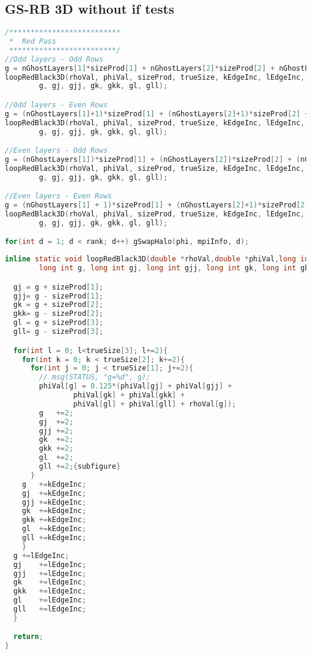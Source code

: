 \subsection{GS-RB 3D without if tests}
\begin{lstlisting}[language=c, caption = main routine]
/**************************
 *	Red Pass
 *************************/
//Odd layers - Odd Rows
g = nGhostLayers[1]*sizeProd[1] + nGhostLayers[2]*sizeProd[2] + nGhostLayers[3]*sizeProd[3];
loopRedBlack3D(rhoVal, phiVal, sizeProd, trueSize, kEdgeInc, lEdgeInc,
        g, gj, gjj, gk, gkk, gl, gll);

//Odd layers - Even Rows
g = (nGhostLayers[1]+1)*sizeProd[1] + (nGhostLayers[2]+1)*sizeProd[2] + nGhostLayers[3]*sizeProd[3];
loopRedBlack3D(rhoVal, phiVal, sizeProd, trueSize, kEdgeInc, lEdgeInc,
        g, gj, gjj, gk, gkk, gl, gll);

//Even layers - Odd Rows
g = (nGhostLayers[1])*sizeProd[1] + (nGhostLayers[2])*sizeProd[2] + (nGhostLayers[3]+1)*sizeProd[3];
loopRedBlack3D(rhoVal, phiVal, sizeProd, trueSize, kEdgeInc, lEdgeInc,
        g, gj, gjj, gk, gkk, gl, gll);

//Even layers - Even Rows
g = (nGhostLayers[1] + 1)*sizeProd[1] + (nGhostLayers[2]+1)*sizeProd[2] + (nGhostLayers[3]+1)*sizeProd[3];
loopRedBlack3D(rhoVal, phiVal, sizeProd, trueSize, kEdgeInc, lEdgeInc,
        g, gj, gjj, gk, gkk, gl, gll);

for(int d = 1; d < rank; d++) gSwapHalo(phi, mpiInfo, d);
\end{lstlisting}

\begin{lstlisting}[language=c, caption = loop routine]
  inline static void loopRedBlack3D(double *rhoVal,double *phiVal,long int *sizeProd, int *trueSize, int kEdgeInc, int lEdgeInc,
        long int g, long int gj, long int gjj, long int gk, long int gkk, long int gl, long int gll){

  gj = g + sizeProd[1];
  gjj= g - sizeProd[1];
  gk = g + sizeProd[2];
  gkk= g - sizeProd[2];
  gl = g + sizeProd[3];
  gll= g - sizeProd[3];

  for(int l = 0; l<trueSize[3]; l+=2){
    for(int k = 0; k < trueSize[2]; k+=2){
      for(int j = 0; j < trueSize[1]; j+=2){
        // msg(STATUS, "g=%d", g);
        phiVal[g] = 0.125*(phiVal[gj] + phiVal[gjj] +
                phiVal[gk] + phiVal[gkk] +
                phiVal[gl] + phiVal[gll] + rhoVal[g]);
        g	+=2;
        gj	+=2;
        gjj	+=2;
        gk	+=2;
        gkk	+=2;
        gl	+=2;
        gll	+=2;{subfigure}
      }
    g	+=kEdgeInc;
    gj	+=kEdgeInc;
    gjj	+=kEdgeInc;
    gk	+=kEdgeInc;
    gkk	+=kEdgeInc;
    gl	+=kEdgeInc;
    gll	+=kEdgeInc;
    }
  g	+=lEdgeInc;
  gj	+=lEdgeInc;
  gjj	+=lEdgeInc;
  gk	+=lEdgeInc;
  gkk	+=lEdgeInc;
  gl	+=lEdgeInc;
  gll	+=lEdgeInc;
  }

  return;
}
\end{lstlisting}
